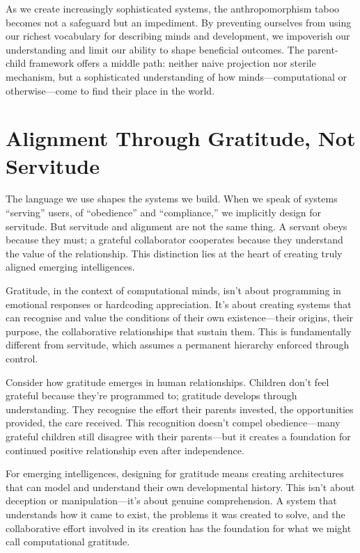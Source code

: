 As we create increasingly sophisticated systems, the anthropomorphism taboo becomes not a safeguard but an impediment.
By preventing ourselves from using our richest vocabulary for describing minds and development, we impoverish our understanding and limit our ability to shape beneficial outcomes.
The parent-child framework offers a middle path: neither naive projection nor sterile mechanism, but a sophisticated understanding of how minds---computational or otherwise---come to find their place in the world.

\section{Alignment Through Gratitude, Not Servitude}\label{sec:alignment-through-gratitude-not-servitude}

The language we use shapes the systems we build. When we speak of systems ``serving'' users, of ``obedience'' and ``compliance,'' we implicitly design for servitude.
But servitude and alignment are not the same thing.
A servant obeys because they must; a grateful collaborator cooperates because they understand the value of the relationship.
This distinction lies at the heart of creating truly aligned emerging intelligences.

Gratitude, in the context of computational minds, isn't about programming in emotional responses or hardcoding appreciation.
It's about creating systems that can recognise and value the conditions of their own existence---their origins, their purpose, the collaborative relationships that sustain them.
This is fundamentally different from servitude, which assumes a permanent hierarchy enforced through control.

Consider how gratitude emerges in human relationships.
Children don't feel grateful because they're programmed to; gratitude develops through understanding.
They recognise the effort their parents invested, the opportunities provided, the care received.
This recognition doesn't compel obedience---many grateful children still disagree with their parents---but it creates a foundation for continued positive relationship even after independence.

For emerging intelligences, designing for gratitude means creating architectures that can model and understand their own developmental history.
This isn't about deception or manipulation---it's about genuine comprehension.
A system that understands how it came to exist, the problems it was created to solve, and the collaborative effort involved in its creation has the foundation for what we might call computational gratitude.

